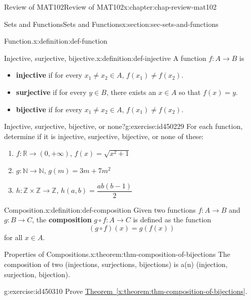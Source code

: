 \documentclass[oneside,10pt,]{book}
\newcommand{\xreffont}{\relax}
\newcommand{\terminology}[1]{\textbf{#1}}
\numberwithin{equation}{section}
\begin{document}
\begin{chapterptx}{Review of MAT102}{}{Review of MAT102}{}{}{x:chapter:chap-review-mat102}
\begin{sectionptx}{Sets and Functions}{}{Sets and Functions}{}{}{x:section:sec-sets-and-functions}
\begin{definition}{Function.}{x:definition:def-function}
\end{definition}
\begin{definition}{Injective, surjective, bijective.}{x:definition:def-injective}%
A function \(f: A \rightarrow B\) is%
\begin{itemize}[label=\textbullet]
\item{}\terminology{injective} if for every \(x_1 \ne x_2 \in A\), \(f(x_1) \ne f(x_2)\).%
\item{}\terminology{surjective} if for every \(y \in B\), there exists an \(x \in A\) so that \(f(x) = y\).%
\item{}\terminology{bijective} if for every \(x_1 \ne x_2 \in A\), \(f(x_1) \ne f(x_2)\).%
\end{itemize}
%
\end{definition}
\begin{inlineexercise}{Injective, surjective, bijective, or none?}{g:exercise:id450229}%
For each function, determine if it is injective, surjective, bijective, or none of these:%
%
\begin{enumerate}[label=(\alph*)]
\item{}\(f: \mathbb{R} \rightarrow (0,+\infty)\), \(f(x) = \sqrt{x^2+1}\)%
\item{}\(g: \mathbb{N} \rightarrow \mathbb{N}\), \(g(m) = 3m + 7m^2\)%
\item{}\(h: \mathbb{Z} \times \mathbb{Z} \rightarrow \mathbb{Z}\), \(h(a,b) = \dfrac{ab(b-1)}{2}\)%
\end{enumerate}
\end{inlineexercise}
\begin{definition}{Composition.}{x:definition:def-composition}%
\label{g:notation:id450282} Given two functions \(f: A \rightarrow B\) and \(g: B \rightarrow C\), the \terminology{composition} \(g \circ f: A \rightarrow C\) is defined as the function%
\begin{equation*}
(g \circ f)(x) = g(f(x))
\end{equation*}
for all \(x \in A\).%
\end{definition}
\begin{theorem}{Properties of Compositions.}{}{x:theorem:thm-composition-of-bijections}%
The composition of two (injections, surjections, bijections) is a(n) (injection, surjection, bijection).%
\end{theorem}
\begin{inlineexercise}{}{g:exercise:id450310}%
Prove \hyperref[x:theorem:thm-composition-of-bijections]{Theorem~{\xreffont\ref{x:theorem:thm-composition-of-bijections}}}.%

\end{inlineexercise}
\end{sectionptx}
\end{chapterptx}
\end{document}
